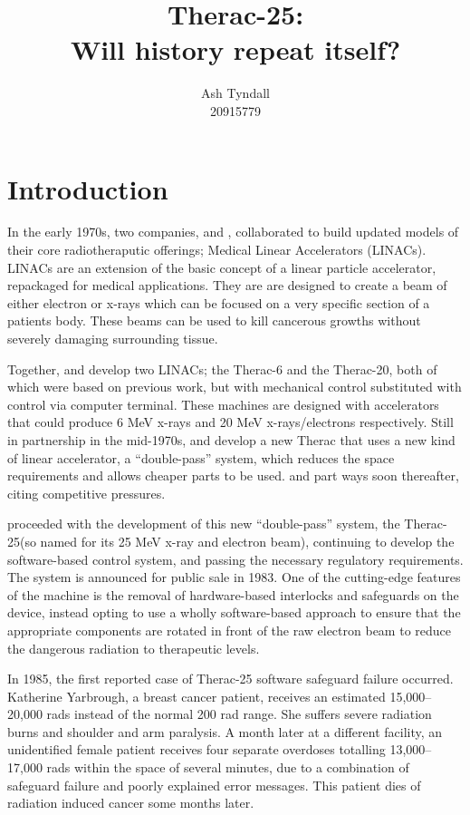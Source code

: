 \documentclass{cshonours}
\title{Therac-25:\\Will history repeat itself?}
\author{Ash Tyndall\\20915779}
\newcommand{\ther}{Therac-25\xspace}
\begin{document}
\maketitle

\tableofcontents

\chapter{Introduction}

In the early 1970s, two companies, \aecl and \cgr, collaborated to build updated models of their core radiotheraputic offerings; Medical Linear Accelerators (LINACs). LINACs are an extension of the basic concept of a linear particle accelerator, repackaged for medical applications. They are are designed to create a beam of either electron or x-rays which can be focused on a very specific section of a patients body. These beams can be used to kill cancerous growths without severely damaging surrounding tissue.

Together, \aecl and \cgr develop two LINACs; the Therac-6 and the Therac-20, both of which were based on previous \cgr work, but with mechanical control substituted with control via computer terminal. These machines are designed with accelerators that could produce 6 MeV x-rays and 20 MeV x-rays/electrons respectively. Still in partnership in the mid-1970s, \aecl and \cgr develop a new Therac that uses a new kind of linear accelerator, a ``double-pass'' system, which reduces the space requirements and allows cheaper parts to be used. \aecl and \cgr part ways soon thereafter, citing competitive pressures. 

\aecl proceeded with the development of this new ``double-pass'' system, the \ther (so named for its 25 MeV x-ray and electron beam), continuing to develop the software-based control system, and passing the necessary regulatory requirements. The system is announced for public sale in 1983. One of the cutting-edge features of the machine is the removal of hardware-based interlocks and safeguards on the device, \aecl instead opting to use a wholly software-based approach to ensure that the appropriate components are rotated in front of the raw electron beam to reduce the dangerous radiation to therapeutic levels.

In 1985, the first reported case of \ther software safeguard failure occurred. Katherine Yarbrough, a breast cancer patient, receives an estimated 15,000--20,000 rads instead of the normal 200 rad range. She suffers severe radiation burns and shoulder and arm paralysis. A month later at a different facility, an unidentified female patient receives four separate overdoses totalling 13,000--17,000 rads within the space of several minutes, due to a combination of safeguard failure and poorly explained error messages. This patient dies of radiation induced cancer some months later.
\end{document}
